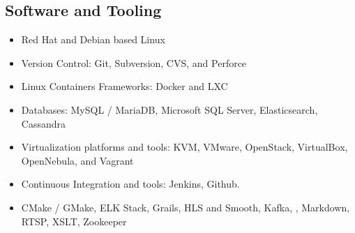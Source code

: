 \documentclass[11pt,letterpaper,roman]{moderncv} %
\begin{document}
\subsection{Software and Tooling}

\cvitem{}
{
\begin{itemize}
\item Red Hat and Debian based Linux
\item Version Control: Git, Subversion, CVS, and Perforce
\item Linux Containers Frameworks: Docker and LXC
\item Databases: MySQL / MariaDB, Microsoft SQL Server, Elasticsearch, Cassandra
\item Virtualization platforms and tools: KVM, VMware, OpenStack, VirtualBox, OpenNebula, and Vagrant
\item Continuous Integration and tools: Jenkins, Github.
\item CMake / GMake, ELK Stack, Grails, HLS and Smooth, Kafka, \LaTeXe, Markdown, RTSP, XSLT, Zookeeper
\end{itemize}
}
\end{document}
